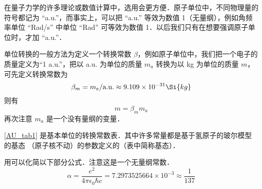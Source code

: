

在量子力学的许多理论或数值计算中，选用会更方便．原子单位中，不同物理量的符号都记为 “a.u.”，而事实上，可以把 “a.u.” 等效为数值 1（无量纲），例如角频率单位 “Rad/s” 中单位 “Rad” 可等效为数值 1．以后我们只有在想要强调原子单位时，才加 “a.u.”．

单位转换的一般方法为定义一个转换常数 $\beta$，例如原子单位中，我们把一个电子的质量定义为“1 a.u.”，把以 a.u. 为单位的质量 $m_a$ 转换为以 kg 为单位的质量 $m$，可先定义转换常数为
\begin{equation}
\beta_m = m_e/\text{a.u.} \approx 9.109 \times 10^{-31}\Si{kg}
\end{equation}
则有
\begin{equation}
m = \beta_m m_a
\end{equation}
再次注意 $m_a$ 是一个没有量纲的变量．

\autoref{AU_tab1} %
是基本单位的转换常数表．其中许多常量都是基于氢原子的玻尔模型的基态%
（原子核不动）的参数定义的（表中简称基态）．

用可以化简以下部分公式．注意这是一个无量纲常数．
\begin{equation}
\alpha  = \frac{e^2}{4\pi\epsilon_0\hbar c} = 7.2973525664 \times 10^{-3} \approx \frac{1}{137}
\end{equation}

